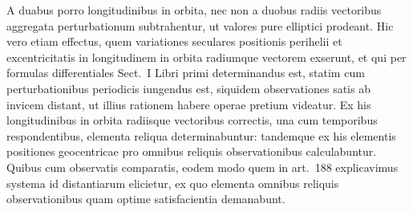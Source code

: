 A duabus porro longitudinibus in orbita, nec non a duobus radiis vectoribus
aggregata perturbationum subtrahentur, ut valores pure elliptici prodeant.
Hic vero etiam effectus, quem variationes seculares positionis perihelii et excentricitatis
in longitudinem in orbita radiumque vectorem exserunt, et qui per
formulas differentiales Sect.~I Libri primi determinandus est, statim cum perturbationibus
periodicis iungendus est, siquidem observationes satis ab invicem
distant, ut illius rationem habere operae pretium videatur. Ex his longitudinibus
in orbita radiisque vectoribus correctis, una cum temporibus respondentibus,
elementa reliqua determinabuntur: tandemque ex his elementis positiones
geocentricae pro omnibus reliquis observationibus calculabuntur. Quibus
cum observatis comparatis, eodem modo quem in art.~188 explicavimus systema
id distantiarum elicietur, ex quo elementa omnibus reliquis observationibus
quam optime satisfacientia demanabunt.
